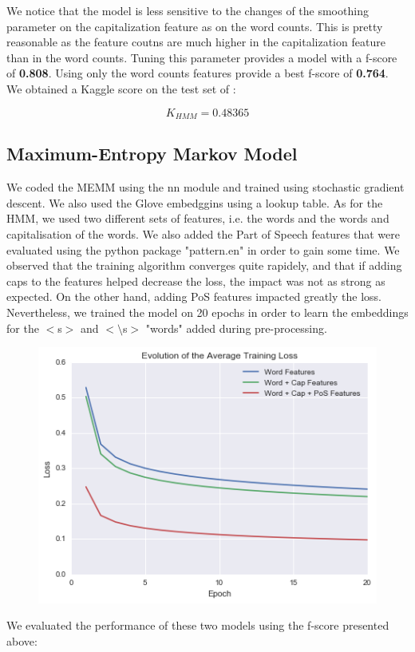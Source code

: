 \documentclass[11pt]{article}
\begin{document}
We notice that the model is less sensitive to the changes of the smoothing parameter on the capitalization feature as on the word counts. This is pretty reasonable as the feature coutns are much higher in the capitalization feature than in the word counts. Tuning this parameter provides a model with a f-score of \textbf{0.808}. Using only the word counts features provide a best f-score of \textbf{0.764}.\\

We obtained a Kaggle score on the test set of :

$$K_{HMM} = 0.48365$$

\subsection{Maximum-Entropy Markov Model}

We coded the MEMM using the nn module and trained using stochastic gradient descent. We also used the Glove embedggins using a lookup table. As for the HMM, we used two different sets of features, i.e. the words and the words and capitalisation of the words. We also added the Part of Speech features that were evaluated using the python package "pattern.en" in order to gain some time. We observed that the training algorithm converges quite rapidely, and that if adding caps to the features helped decrease the loss, the impact was not as strong as expected. On the other hand, adding PoS features impacted greatly the loss. Nevertheless, we trained the model on 20 epochs in order to learn the embeddings for the $<$s$>$ and $<\setminus$s$>$ "words" added during pre-processing.

\begin{figure}[H]
\centering
\includegraphics[width=0.6\linewidth]{loss_mem}
\end{figure}

We evaluated the performance of these two models using the f-score presented above:
\end{document}
